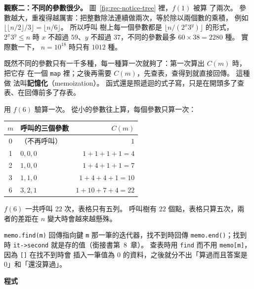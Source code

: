 \textbf{觀察二：不同的參數很少。} 圖~\ref{fig:rec-notice-tree} 裡，$f(1)$ 被算
了兩次。 參數越大，重複得越厲害：把整數除法連續做兩次，等於除以兩個數的乘積，
例如 $\lfloor \lfloor n/2 \rfloor / 3 \rfloor = \lfloor n/6 \rfloor$。 所以呼叫
樹上每一個參數都是 $\lfloor n / (2^x 3^y) \rfloor$ 的形式，$2^x 3^y \le n$ 時
$x$ 不超過 $59$、$y$ 不超過 $37$，不同的參數最多 $60 \times 38 = 2280$ 種。 實際數一下，
$n = 10^{18}$ 時只有 $1012$ 種。

既然不同的參數只有一千多種，每一種算一次就夠了：第一次算出 $C(m)$ 時，把它存
在一個 \texttt{map} 裡；之後再需要 $C(m)$，先查表，查得到就直接回傳。 這種做
法叫\textbf{記憶化}（memoization）。 函式還是照遞迴的式子寫，只是在開頭多了查
表、在回傳前多了存表。

用 $f(6)$ 驗算一次。 從小的參數往上算，每個參數只算一次：

\begin{center}
\begin{tabular}{clr}
\toprule
$m$ & 呼叫的三個參數 & $C(m)$ \\
\midrule
0 & （不再呼叫） & $1$ \\
1 & $0, 0, 0$ & $1 + 1 + 1 + 1 = 4$ \\
2 & $1, 0, 0$ & $1 + 4 + 1 + 1 = 7$ \\
3 & $1, 1, 0$ & $1 + 4 + 4 + 1 = 10$ \\
6 & $3, 2, 1$ & $1 + 10 + 7 + 4 = 22$ \\
\bottomrule
\end{tabular}
\end{center}

$f(6)$ 一共呼叫 $22$ 次，表格只有五列。 呼叫樹有 $22$ 個點，表格只算五次，兩
者的差距在 $n$ 變大時會越來越懸殊。

\begin{bridgerecap}
\texttt{memo.find(m)} 回傳指向鍵 \texttt{m} 那一筆的迭代器，找不到時回傳
\texttt{memo.end()}；找到時 \texttt{it->second} 就是存的值（銜接書第~8~章）。
查表時用 \texttt{find} 而不用 \texttt{memo[m]}，因為 \texttt{[]} 在找不到時會
插入一筆值為 $0$ 的資料，之後就分不出「算過而且答案是 $0$」和「還沒算過」。
\end{bridgerecap}

\textbf{程式}

